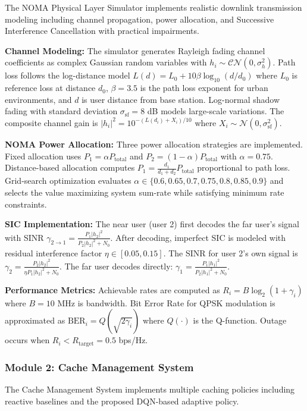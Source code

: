 \documentclass[12pt,a4paper]{article}
\begin{document}
The NOMA Physical Layer Simulator implements realistic downlink transmission modeling including channel propagation, power allocation, and Successive Interference Cancellation with practical impairments.

\textbf{Channel Modeling:} The simulator generates Rayleigh fading channel coefficients as complex Gaussian random variables with $h_i \sim \mathcal{CN}(0, \sigma_h^2)$. Path loss follows the log-distance model $L(d) = L_0 + 10\beta \log_{10}(d/d_0)$ where $L_0$ is reference loss at distance $d_0$, $\beta = 3.5$ is the path loss exponent for urban environments, and $d$ is user distance from base station. Log-normal shadow fading with standard deviation $\sigma_{\text{sf}} = 8$ dB models large-scale variations. The composite channel gain is $|h_i|^2 = 10^{-(L(d_i) + X_i)/10}$ where $X_i \sim \mathcal{N}(0, \sigma_{\text{sf}}^2)$.

\textbf{NOMA Power Allocation:} Three power allocation strategies are implemented. Fixed allocation uses $P_1 = \alpha P_{\text{total}}$ and $P_2 = (1-\alpha)P_{\text{total}}$ with $\alpha = 0.75$. Distance-based allocation computes $P_1 = \frac{d_1}{d_1 + d_2} P_{\text{total}}$ proportional to path loss. Grid-search optimization evaluates $\alpha \in \{0.6, 0.65, 0.7, 0.75, 0.8, 0.85, 0.9\}$ and selects the value maximizing system sum-rate while satisfying minimum rate constraints.

\textbf{SIC Implementation:} The near user (user 2) first decodes the far user's signal with SINR $\gamma_{2 \rightarrow 1} = \frac{P_1 |h_2|^2}{P_2 |h_2|^2 + N_0}$. After decoding, imperfect SIC is modeled with residual interference factor $\eta \in [0.05, 0.15]$. The SINR for user 2's own signal is $\gamma_2 = \frac{P_2 |h_2|^2}{\eta P_1 |h_2|^2 + N_0}$. The far user decodes directly: $\gamma_1 = \frac{P_1 |h_1|^2}{P_2 |h_1|^2 + N_0}$.

\textbf{Performance Metrics:} Achievable rates are computed as $R_i = B \log_2(1 + \gamma_i)$ where $B = 10$ MHz is bandwidth. Bit Error Rate for QPSK modulation is approximated as $\text{BER}_i = Q(\sqrt{2\gamma_i})$ where $Q(\cdot)$ is the Q-function. Outage occurs when $R_i < R_{\text{target}} = 0.5$ bps/Hz.

\subsubsection{Module 2: Cache Management System}

The Cache Management System implements multiple caching policies including reactive baselines and the proposed DQN-based adaptive policy.
\end{document}
